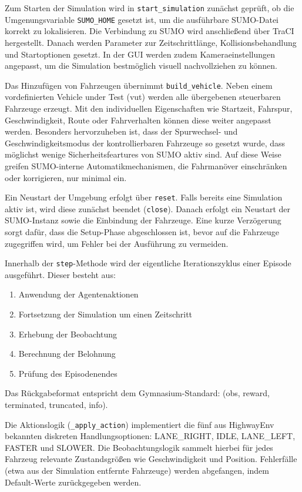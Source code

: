 Zum Starten der Simulation wird in \texttt{start\_simulation} zunächst geprüft, ob die Umgenungsvariable \texttt{SUMO\_HOME} gesetzt ist, um die ausführbare SUMO-Datei korrekt zu lokalisieren. Die Verbindung zu SUMO wird anschließend über TraCI hergestellt. Danach werden Parameter zur Zeitschrittlänge, Kollisionsbehandlung und Startoptionen gesetzt. In der GUI werden zudem Kameraeinstellungen angepasst, um die Simulation bestmöglich visuell nachvollziehen zu können.

Das Hinzufügen von Fahrzeugen übernimmt \texttt{build\_vehicle}. Neben einem vordefinierten Vehicle under Test (vut) werden alle übergebenen steuerbaren Fahrzeuge erzeugt. Mit den individuellen Eigenschaften wie Startzeit, Fahrspur, Geschwindigkeit, Route oder Fahrverhalten können diese weiter angepasst werden. Besonders hervorzuheben ist, dass der Spurwechsel- und Geschwindigkeitsmodus der kontrollierbaren Fahrzeuge so gesetzt wurde, dass möglichst wenige Sicherheitsfeartures von SUMO aktiv sind. Auf diese Weise greifen SUMO-interne Automatikmechanismen, die Fahrmanöver einschränken oder korrigieren, nur minimal ein. 

Ein Neustart der Umgebung erfolgt über \texttt{reset}. Falls bereits eine Simulation aktiv ist, wird diese zunächst beendet (\texttt{close}). Danach erfolgt ein Neustart der SUMO-Instanz sowie die Einbindung der Fahrzeuge. Eine kurze Verzögerung sorgt dafür, dass die Setup-Phase abgeschlossen ist, bevor auf die Fahrzeuge zugegriffen wird, um Fehler bei der Ausführung zu vermeiden.

Innerhalb der \texttt{step}-Methode wird der eigentliche Iterationszyklus einer Episode ausgeführt. Dieser besteht aus:
\begin{enumerate}
    \item Anwendung der Agentenaktionen
    \item Fortsetzung der Simulation um einen Zeitschritt
    \item Erhebung der Beobachtung
    \item Berechnung der Belohnung
    \item Prüfung des Episodenendes
\end{enumerate}
Das Rückgabeformat entspricht dem Gymnasium-Standard: (obs, reward, terminated, truncated, info).

Die Aktionslogik (\texttt{\_apply\_action}) implementiert die fünf aus HighwayEnv bekannten diskreten Handlungsoptionen: LANE\_RIGHT, IDLE, LANE\_LEFT, FASTER und SLOWER. Die Beobachtungslogik sammelt hierbei für jedes Fahrzeug relevante Zustandsgrößen wie Geschwindigkeit und Position. Fehlerfälle (etwa aus der Simulation entfernte Fahrzeuge) werden abgefangen, indem Default-Werte zurückgegeben werden.


